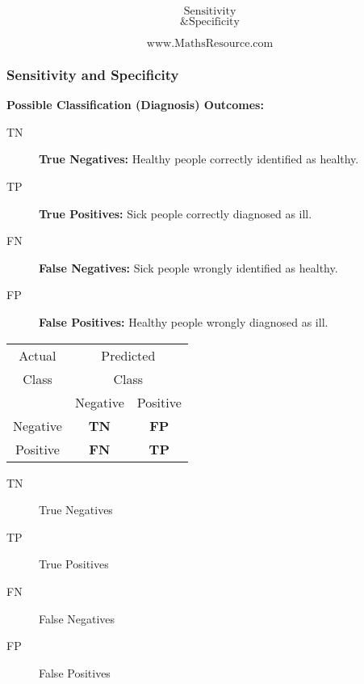\documentclass{beamer}
\begin{document}
\begin{frame}
\bigskip
{
\Huge
\[ \mbox{Sensitivity} \]
\[ \mbox{\& Specificity} \]
}
{
\LARGE
\[ \mbox{www.MathsResource.com} \]

}
\end{frame}
\begin{frame}
\frametitle{Sensitivity and Specificity}
\Large
 \textbf{Possible Classification (Diagnosis) Outcomes:}\\ \bigskip
\begin{description}
\item[TN] \textbf{True Negatives:} Healthy people correctly identified as healthy.
\item[TP] \textbf{True Positives:} Sick people correctly diagnosed as ill.
\item[FN] \textbf{False Negatives:} Sick people wrongly identified as healthy.
\item[FP] \textbf{False Positives:} Healthy people wrongly diagnosed as ill.
\end{description}


\end{frame}

\begin{frame}

{
\LARGE
\centering
\begin{table}[!htbp]

\begin{tabular}{c | *2c }
Actual  & \multicolumn{2}{c}{Predicted}\\
Class  & \multicolumn{2}{c}{Class}\\
\midrule
{}   & Negative & Positive       \\
Negative  &  \textbf{TN} & \textbf{FP}  \\
Positive   &  \textbf{FN} & \textbf{TP}  \\
\end{tabular}
\end{table}
}
\begin{description}
\item[TN] True Negatives
\item[TP] True Positives
\item[FN] False Negatives
\item[FP] False Positives
\end{description}

\end{frame}
\end{document}
